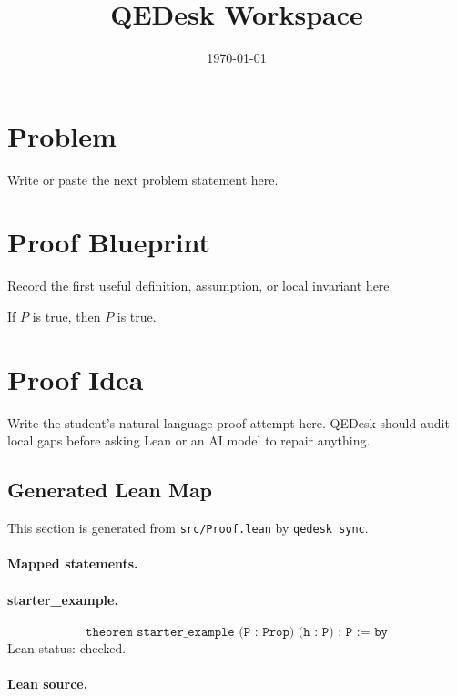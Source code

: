 \documentclass[11pt]{article}
\title{QEDesk Workspace}
\author{}
\date{\today}
\begin{document}
\maketitle

\section{Problem}

Write or paste the next problem statement here.

\section{Proof Blueprint}

Record the first useful definition, assumption, or local invariant here.

If $P$ is true, then $P$ is true.

\section{Proof Idea}

Write the student's natural-language proof attempt here. QEDesk should audit
local gaps before asking Lean or an AI model to repair anything.

\subsection*{Generated Lean Map}

This section is generated from \texttt{src/Proof.lean} by \texttt{qedesk sync}.

\paragraph{Mapped statements.}

\paragraph{starter\_example.}
\[
  \texttt{theorem starter\_example (P : Prop) (h : P) : P := by}
\]
Lean status: checked.

\paragraph{Lean source.}
\end{document}
